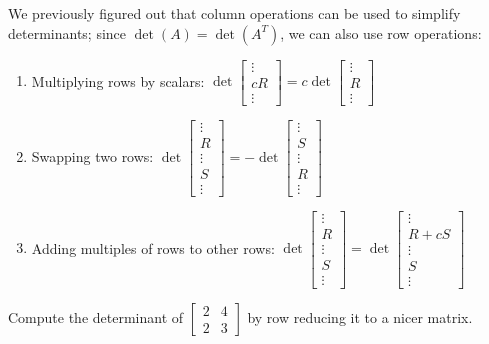 \begin{applicationActivities}{2}{26}
\begin{fact}
We previously figured out that column operations can be used to simplify
determinants; since \(\det(A)=\det(A^T)\), we can also use row operations:
\begin{enumerate}
\item Multiplying rows by scalars:
  \(\det\begin{bmatrix}\vdots\\cR\\\vdots\end{bmatrix}=
  c\det\begin{bmatrix}\vdots\\R\\\vdots\end{bmatrix}\)
\item Swapping two rows:
  \(\det\begin{bmatrix}\vdots\\R\\\vdots\\S\\\vdots\end{bmatrix}=
  -\det\begin{bmatrix}\vdots\\S\\\vdots\\R\\\vdots\end{bmatrix}\)
\item Adding multiples of rows to other rows:
  \(\det\begin{bmatrix}\vdots\\R\\\vdots\\S\\\vdots\end{bmatrix}=
  \det\begin{bmatrix}\vdots\\R+cS\\\vdots\\S\\\vdots\end{bmatrix}\)
\end{enumerate}
\end{fact}

\begin{activity}{10}
  Compute the determinant of $\begin{bmatrix} 2 & 4 \\ 2 & 3 \end{bmatrix}$ by row reducing it to a nicer matrix. \\


\end{activity}
\end{applicationActivities}
